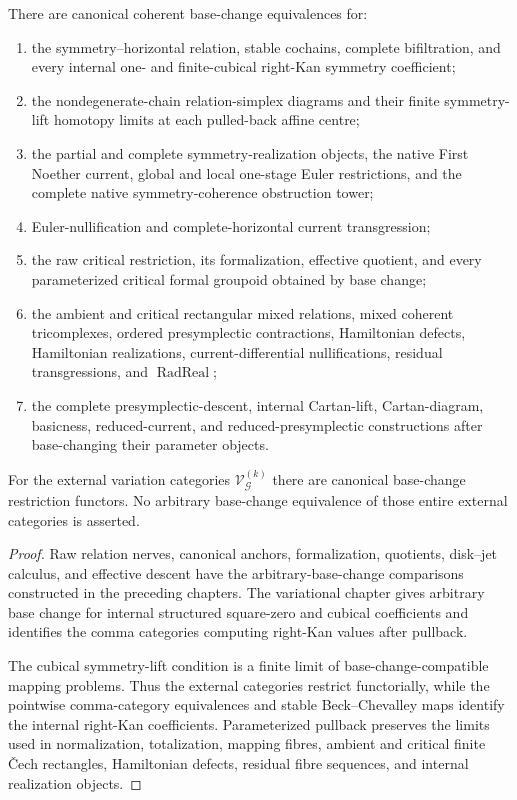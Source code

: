 \begin{theorem}
\label{thm:symmetry-noether-arbitrary-base-change-for-internal-native-noether-geometry}
There are canonical coherent base-change equivalences for:
\begin{enumerate}
\item the symmetry--horizontal relation, stable cochains, complete bifiltration, and
      every internal one- and finite-cubical right-Kan symmetry coefficient;
\item the nondegenerate-chain relation-simplex diagrams and their finite symmetry-lift
      homotopy limits at each pulled-back affine centre;
\item the partial and complete symmetry-realization objects, the native First
      Noether current, global and local one-stage Euler restrictions, and the
      complete native symmetry-coherence obstruction tower;
\item Euler-nullification and complete-horizontal current transgression;
\item the raw critical restriction, its formalization, effective quotient, and every
      parameterized critical formal groupoid obtained by base change;
\item the ambient and critical rectangular mixed relations, mixed coherent
      tricomplexes, ordered presymplectic contractions, Hamiltonian defects,
      Hamiltonian realizations, current-differential nullifications, residual
      transgressions, and $\operatorname{RadReal}$;
\item the complete presymplectic-descent, internal Cartan-lift, Cartan-diagram,
      basicness, reduced-current, and reduced-presymplectic constructions after
      base-changing their parameter objects.
\end{enumerate}

For the external variation categories $\mathcal V_{\mathcal G}^{(k)}$ there are
canonical base-change restriction functors.  No arbitrary base-change equivalence
of those entire external categories is asserted.
\end{theorem}

\begin{proof}
Raw relation nerves, canonical anchors, formalization, quotients, disk--jet
calculus, and effective descent have the arbitrary-base-change comparisons
constructed in the preceding chapters.  The variational chapter gives arbitrary
base change for internal structured square-zero and cubical coefficients and
identifies the comma categories computing right-Kan values after pullback.

The cubical symmetry-lift condition is a finite limit of base-change-compatible
mapping problems.  Thus the external categories restrict functorially, while the
pointwise comma-category equivalences and stable Beck--Chevalley maps identify the
internal right-Kan coefficients.  Parameterized pullback preserves the limits used
in normalization, totalization, mapping fibres, ambient and critical finite \v{C}ech rectangles,
Hamiltonian defects, residual fibre sequences, and internal realization objects.
\end{proof}

